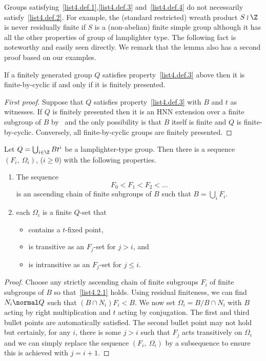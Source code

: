 Groups satisfying~\eqref{list4.def.1},\eqref{list4.def.3} and~\eqref{list4.def.4} do not necessarily satisfy~\eqref{list4.def.2}. For example, the (standard restricted) wreath product $S\wr\Z$ is never residually finite if $S$ is a (non-abelian) finite simple group although it has all the other properties of group of lamplighter type. The following fact is noteworthy and easily seen directly. We remark that the lemma also has a second proof based on our examples.

\begin{lemm}\label{lemmawith2proofs}
If a finitely generated group $Q$ satisfies property~\eqref{list4.def.3} above then it is finite-by-cyclic if and only if it is finitely presented.
\end{lemm}


\begin{proof}[First proof]
Suppose that $Q$ satisfies property~\eqref{list4.def.3} with $B$ and $t$ as witnesses. If $Q$ is finitely presented then it is an HNN extension over a finite subgroup of $B$ by~\cite[Theorem~A]{BS} and the only possibility is that $B$ itself is finite and $Q$ is finite-by-cyclic. Conversely, all finite-by-cyclic groups are finitely presented.
\end{proof}



\begin{lemm}\label{setup}
Let $Q=\bigcup_{i\in\Z}Bt^i$ be a lamplighter-type group. Then there is a sequence $(F_i,\ \Omega_i)$, ($i\ge0$) with the following properties.
\begin{enumerate}\romanenumi
\item \label{list4.2.1}The sequence
\[
F_0<F_1<F_2<\dots
\]
is an ascending chain of finite subgroups of $B$ such that $B=\bigcup_iF_i$.
\item \label{list4.2.2}each $\Omega_i$ is a finite $Q$-set that
\begin{itemize}
\item contains a $t$-fixed point,
\item is transitive as an $F_j$-set for $j>i$, and
\item is intransitive as an $F_j$-set for $j\le i$.
\end{itemize}
\end{enumerate}
\end{lemm}


\begin{proof}
Choose any strictly ascending chain of finite subgroups $F_i$ of finite subgroups of $B$ so that~\eqref{list4.2.1} holds. Using residual finiteness, we can find $N_i\normal Q$ such that $(B\cap N_i)F_i<B$. We now set $\Omega_i=B/B\cap N_i$ with $B$ acting by right multiplication and $t$ acting by conjugation. The first and third bullet points are automatically satisfied. The second bullet point may not hold but certainly, for any $i$, there is some $j>i$ such that $F_j$ acts transitively on $\Omega_i$ and we can simply replace the sequence $(F_i,\ \Omega_i)$ by a subsequence to ensure this is achieved with $j=i+1$.
\end{proof}

